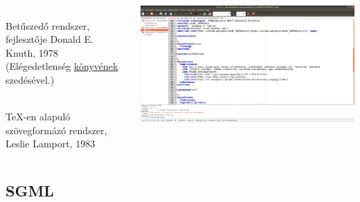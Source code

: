 \documentclass[usenames,dvipsnames,aspectratio=169]{beamer}
\newcommand{\hiv}[1]{{\color{hivatkozasszin}#1}}
\begin{document}
\begin{frame}
  \begin{columns}[T]
      \begin{description}[m]
        \item[\TeX] \hfill \\ Betűszedő rendszer, fejlesztője Donald E. Knuth, 1978 (Elégedetlenség \hiv{\href{https://www-cs-faculty.stanford.edu/~knuth/taocp.html}{könyvének}} szedésével.)
        \item[\LaTeX] \hfill \\ \TeX-en alapuló szövegformázó rendszer, Leslie Lamport, 1983
      \end{description}
        \begin{exampleblock}{}
          \centering
          \includegraphics[scale=.14]{./latex.png}
        \end{exampleblock}
  \end{columns}
\end{frame}

\subsection{SGML}
\end{document}

